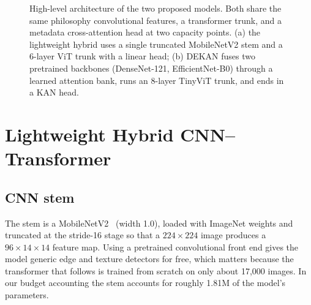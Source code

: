 \begin{figure}[H]
{%
}
\caption{High-level architecture of the two proposed models. Both share the same
philosophy convolutional features, a transformer trunk, and a metadata
cross-attention head at two capacity points. (a) the lightweight hybrid uses
a single truncated MobileNetV2 stem and a 6-layer ViT trunk with a linear head;
(b) DEKAN fuses two pretrained backbones (DenseNet-121, EfficientNet-B0) through
a learned attention bank, runs an 8-layer TinyViT trunk, and ends in a KAN head.}
\label{fig:arch}
\end{figure}

\section{Lightweight Hybrid CNN--Transformer}

\subsection{CNN stem}

The stem is a MobileNetV2~\cite{sandler2018mobilenetv2} (width 1.0), loaded with
ImageNet weights and truncated at the stride-16 stage so that a
$224\times224$ image produces a $96\times14\times14$ feature map. Using a
pretrained convolutional front end gives the model generic edge and texture
detectors for free, which matters because the transformer that follows is trained
from scratch on only about 17{,}000 images. In our budget accounting the stem
accounts for roughly 1.81M of the model's parameters.

